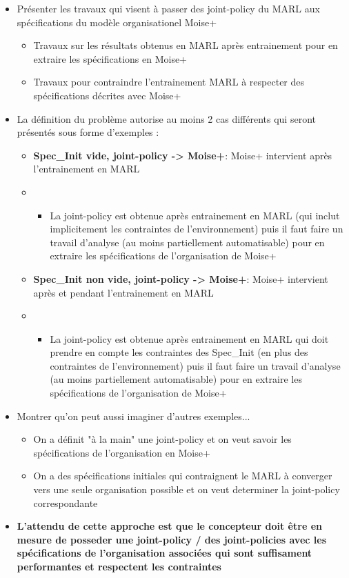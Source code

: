 \begin{itemize}

  \item Présenter les travaux qui visent à passer des joint-policy du MARL aux spécifications du modèle organisationel Moise+
        \begin{itemize}

          \item Travaux sur les résultats obtenus en MARL après entrainement pour en extraire les spécifications en Moise+
          \item Travaux pour contraindre l'entrainement MARL à respecter des spécifications décrites avec Moise+
        \end{itemize}
  \item La définition du problème autorise au moins 2 cas différents qui seront présentés sous forme d'exemples :
        \begin{itemize}
          \item \textbf{Spec\_Init vide, joint-policy -> Moise+}: Moise+ intervient après l'entrainement en MARL
          \item \begin{itemize}
                  \item La joint-policy est obtenue après entrainement en MARL (qui inclut implicitement les contraintes de l'environnement) puis il faut faire un travail d'analyse (au moins partiellement automatisable) pour en extraire les spécifications de l'organisation de Moise+
                \end{itemize}
          \item \textbf{Spec\_Init non vide, joint-policy -> Moise+}: Moise+ intervient après et pendant l'entrainement en MARL
          \item \begin{itemize}
                  \item La joint-policy est obtenue après entrainement en MARL qui doit prendre en compte les contraintes des Spec\_Init (en plus des contraintes de l'environnement) puis il faut faire un travail d'analyse (au moins partiellement automatisable) pour en extraire les spécifications de l'organisation de Moise+
                \end{itemize}
        \end{itemize}
  \item Montrer qu'on peut aussi imaginer d'autres exemples...
        \begin{itemize}
          \item On a définit "à la main" une joint-policy et on veut savoir les spécifications de l'organisation en Moise+
          \item On a des spécifications initiales qui contraignent le MARL à converger vers une seule organisation possible et on veut determiner la joint-policy correspondante
        \end{itemize}
  \item \textbf{L'attendu de cette approche est que le concepteur doit être en mesure de posseder une joint-policy / des joint-policies avec les spécifications de l'organisation associées qui sont suffisament performantes et respectent les contraintes}
\end{itemize}

